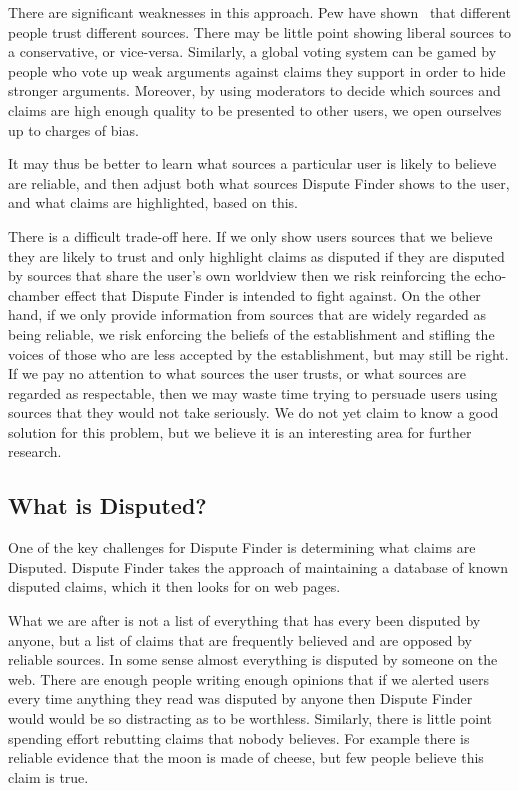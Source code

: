 \documentclass{www2010-submission}
\newcommand{\todo}[1]{}
\begin{document}
\todo{study result: verify}
There are significant weaknesses in this approach. Pew have shown~\cite{pew-news} that different people trust different sources. There may be little point showing liberal sources to a conservative, or vice-versa. Similarly, a global voting system can be gamed by people who vote up weak arguments against claims they support in order to hide stronger arguments. Moreover, by using moderators to decide which sources and claims are high enough quality to be presented to other users, we open ourselves up to charges of bias.

It may thus be better to learn what sources a particular user is likely to believe are reliable, and then adjust both what sources Dispute Finder shows to the user, and what claims are highlighted, based on this.

There is a difficult trade-off here. If we only show users sources that we believe they are likely to trust and only highlight claims as disputed if they are disputed by sources that share the user's own worldview then we risk reinforcing the echo-chamber effect that Dispute Finder is intended to fight against. On the other hand, if we only provide information from sources that are widely regarded as being reliable, we risk enforcing the beliefs of the establishment and stifling the voices of those who are less accepted by the establishment, but may still be right. If we pay no attention to what sources the user trusts, or what sources are regarded as respectable, then we may waste time trying to persuade users using sources that they would not take seriously. We do not yet claim to know a good solution for this problem, but we believe it is an interesting area for further research.

\todo{Cite Pew Research study saying people like to read news that supports their own point of view, but many others like neutral sources. http://people-press.org/report/?pageid=1353}


\subsection{What is Disputed?}

One of the key challenges for Dispute Finder is determining what claims are Disputed. Dispute Finder takes the approach of maintaining a database of known disputed claims, which it then looks for on web pages.

What we are after is not a list of everything that has every been disputed by anyone, but a list of claims that are frequently believed and are opposed by reliable sources. In some sense almost everything is disputed by someone on the web. There are enough people writing enough opinions that if we alerted users every time anything they read was disputed by anyone then Dispute Finder would would be so distracting as to be worthless. Similarly, there is little point spending effort rebutting claims that nobody believes. For example there is reliable evidence that the moon is made of cheese, but few people believe this claim is true.
\end{document}
